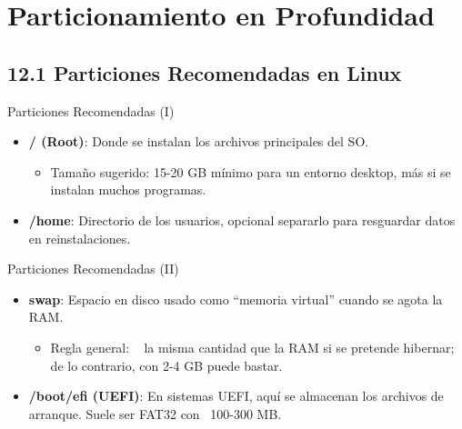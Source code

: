 \documentclass{beamer}
\begin{document}
\section{Particionamiento en Profundidad}

\subsection{12.1 Particiones Recomendadas en Linux}
\begin{frame}{Particiones Recomendadas (I)}
    \begin{itemize}
        \item \textbf{/ (Root)}: Donde se instalan los archivos principales del SO.
        \begin{itemize}
            \item Tamaño sugerido: 15-20 GB mínimo para un entorno desktop, más si se instalan muchos programas.
        \end{itemize}
        \item \textbf{/home}: Directorio de los usuarios, opcional separarlo para resguardar datos en reinstalaciones.
    \end{itemize}
\end{frame}

\begin{frame}{Particiones Recomendadas (II)}
    \begin{itemize}
        \item \textbf{swap}: Espacio en disco usado como “memoria virtual” cuando se agota la RAM.
            \begin{itemize}
                \item Regla general: ~ la misma cantidad que la RAM si se pretende hibernar; de lo contrario, con 2-4 GB puede bastar.
            \end{itemize}
        \item \textbf{/boot/efi (UEFI)}: En sistemas UEFI, aquí se almacenan los archivos de arranque. Suele ser FAT32 con ~100-300 MB.
    \end{itemize}
\end{frame}

\end{document}
